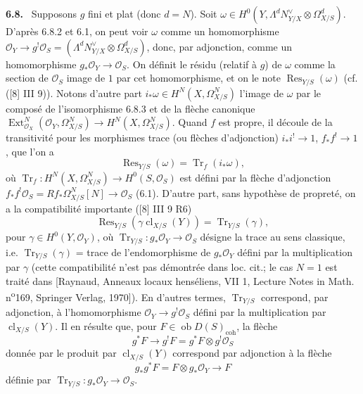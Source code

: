 \documentclass[11pt]{article}
\newenvironment{statement}[1]{\par\medskip\noindent\textbf{#1.}\ }{\par\medskip}
\DeclareMathOperator{\Ext}{Ext}
\newcommand{\ob}{\operatorname{ob}}
\providecommand{\cl}{\operatorname{cl}}
\providecommand{\Tr}{\operatorname{Tr}}
\providecommand{\coh}{\mathrm{coh}}
\providecommand{\OO}{\mathcal O}
\providecommand{\Res}{\operatorname{Res}}
\begin{document}
\begin{statement}{6.8}
Supposons $g$ fini et plat (donc $d=N$). Soit $\omega\in H^0(Y,\Lambda^dN^\vee_{Y/X}\otimes\Omega^d_{X/S})$. D'après 6.8.2 et 6.1, on peut voir $\omega$ comme un homomorphisme $\OO_Y\to g^!\OO_S=(\Lambda^dN^\vee_{Y/X}\otimes\Omega^d_{X/S})$, donc, par adjonction, comme un homomorphisme $g_*\OO_Y\to\OO_S$. On définit le résidu (relatif à $g$) de $\omega$ comme la section de $\OO_S$ image de $1$ par cet homomorphisme, et on le note $\Res_{Y/S}(\omega)$ (cf. ([8] III 9)). Notons d'autre part $i_*\omega\in H^N(X,\Omega^N_{X/S})$ l'image de $\omega$ par le composé de l'isomorphisme 6.8.3 et de la flèche canonique $\Ext^N_{\OO_X}(\OO_Y,\Omega^N_{X/S})\to H^N(X,\Omega^N_{X/S})$. Quand $f$ est propre, il découle de la transitivité pour les morphismes trace (ou flèches d'adjonction) $i_*i^!\to 1$, $f_*f^!\to 1$, que l'on a
\begin{equation}
\tag{6.8.4}
\Res_{Y/S}(\omega)=\Tr_f(i_*\omega),
\end{equation}
où $\Tr_f:H^N(X,\Omega^N_{X/S})\to H^0(S,\OO_S)$ est défini par la flèche d'adjonction $f_*f^!\OO_S=Rf_*\Omega^N_{X/S}[N]\to\OO_S$ (6.1). D'autre part, sans hypothèse de propreté, on a la compatibilité importante ([8] III 9 R6)
\begin{equation}
\tag{6.8.5}
\Res_{Y/S}(\gamma\cl_{X/S}(Y))=\Tr_{Y/S}(\gamma),
\end{equation}
pour $\gamma\in H^0(Y,\OO_Y)$, où $\Tr_{Y/S}:g_*\OO_Y\to\OO_S$ désigne la trace au sens classique, i.e. $\Tr_{Y/S}(\gamma)$ = trace de l'endomorphisme de $g_*\OO_Y$ défini par la multiplication par $\gamma$ (cette compatibilité n'est pas démontrée dans loc. cit.; le cas $N=1$ est traité dans [Raynaud, Anneaux locaux henséliens, VII 1, Lecture Notes in Math. n\textsuperscript{o}169, Springer Verlag, 1970]). En d'autres termes, $\Tr_{Y/S}$ correspond, par adjonction, à l'homomorphisme $\OO_Y\to g^!\OO_S$ défini par la multiplication par $\cl_{X/S}(Y)$. Il en résulte que, pour $F\in\ob D(S)_{\coh}$, la flèche
\begin{equation}
\tag{6.8.6}
g^*F\longrightarrow g^!F=g^*F\otimes g^!\OO_S
\end{equation}
donnée par le produit par $\cl_{X/S}(Y)$ correspond par adjonction à la flèche
\begin{equation}
\tag{6.8.7}
g_*g^*F=F\otimes g_*\OO_Y\longrightarrow F
\end{equation}
définie par $\Tr_{Y/S}:g_*\OO_Y\to\OO_S$.
\end{statement}
\end{document}
